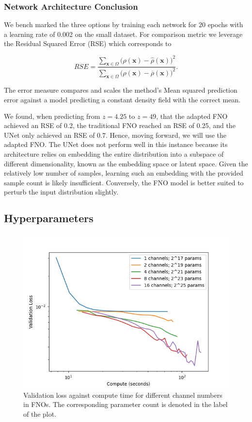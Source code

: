 \documentclass{article}
\begin{document}
\subsubsection{Network Architecture Conclusion}

We bench marked the three options by training each network for 20 epochs with a learning rate of 0.002 on the small dataset. For comparison metric we leverage the Residual Squared Error (RSE) which corresponds to 

\begin{equation}
RSE = \frac{\sum_{\mathbf{x} \in \Omega} \bigl(\rho(\mathbf{x}) - \hat{\rho}(\mathbf{x}) \bigr)^2}{\sum_{\mathbf{x} \in \Omega} \bigl(\rho(\mathbf{x}) - \overline{\rho}(\mathbf{x}) \bigr)^2}.
\end{equation}

The error measure compares and scales the method's Mean squared prediction error against a model predicting a constant density field with the correct mean. 

We found, when predicting from $z=4.25$ to $z=49$, that the adapted FNO achieved an RSE of 0.2, the traditional FNO reached an RSE of 0.25, and the UNet only achieved an RSE of 0.7. Hence, moving forward, we will use the adapted FNO. The UNet does not perform well in this instance because its architecture relies on embedding the entire distribution into a subspace of different dimensionality, known as the embedding space or latent space. Given the relatively low number of samples, learning such an embedding with the provided sample count is likely insufficient. Conversely, the FNO model is better suited to perturb the input distribution slightly.

\subsection{Hyperparameters}


\begin{figure}[h]
    \centering
    \includegraphics[width=0.4\linewidth]{img/channels_compute.png}
    \caption{Validation loss against compute time for different channel numbers in FNOs. The corresponding parameter count is denoted in the label of the plot.}
    \label{fig:channels-B}
\end{figure}
\end{document}
